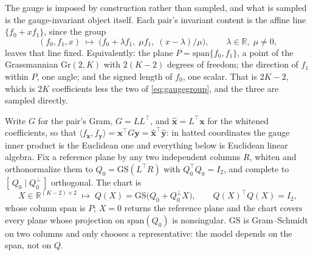 \documentclass[11pt]{article}
\theoremstyle{plain}
\begin{document}
The gauge is imposed by construction rather than sampled, and what is sampled is the
gauge-invariant object itself. Each pair's invariant content is the affine line
$\{f_{0} + x f_{1}\}$, since the group
\begin{equation}
  (f_{0}, f_{1}, x) \;\longmapsto\;
  \bigl(f_{0} + \lambda f_{1},\; \mu f_{1},\; (x - \lambda)/\mu\bigr),
  \qquad \lambda \in \mathbb{R},\; \mu \neq 0 ,
  \label{eq:gaugegroup}
\end{equation}
leaves that line fixed. Equivalently: the plane $P = \mathrm{span}\{f_{0}, f_{1}\}$, a point
of the Grassmannian $\mathrm{Gr}(2,K)$ with $2(K-2)$ degrees of freedom; the direction of
$f_{1}$ within $P$, one angle; and the signed length of $f_{0}$, one scalar. That is
$2K - 2$, which is $2K$ coefficients less the two of \eqref{eq:gaugegroup}, and the three
are sampled directly.

Write $G$ for the pair's Gram, $G = LL^{\top}$, and $\hat{\mathbf{x}} = L^{\top}\mathbf{x}$
for the whitened coefficients, so that $\langle f_{\mathbf{x}}, f_{\mathbf{y}}\rangle =
\mathbf{x}^{\top}G\mathbf{y} = \hat{\mathbf{x}}^{\top}\hat{\mathbf{y}}$: in hatted
coordinates the gauge inner product is the Euclidean one and everything below is Euclidean
linear algebra. Fix a reference plane by any two independent columns $R$, whiten and
orthonormalize them to $Q_{0} = \mathrm{GS}(L^{\top}R)$ with $Q_{0}^{\top}Q_{0} = I_{2}$,
and complete to $[\,Q_{0} \mid Q_{0}^{\perp}\,]$ orthogonal. The chart is
\begin{equation}
  X \in \mathbb{R}^{(K-2)\times 2}
  \;\longmapsto\;
  Q(X) = \mathrm{GS}\bigl(Q_{0} + Q_{0}^{\perp}X\bigr) ,
  \qquad Q(X)^{\top}Q(X) = I_{2} ,
  \label{eq:grasschart}
\end{equation}
whose column span is $P$; $X = 0$ returns the reference plane and the chart covers every
plane whose projection on $\mathrm{span}(Q_{0})$ is nonsingular. $\mathrm{GS}$ is
Gram--Schmidt on two columns and only chooses a representative: the model depends on the
span, not on $Q$.
\end{document}
